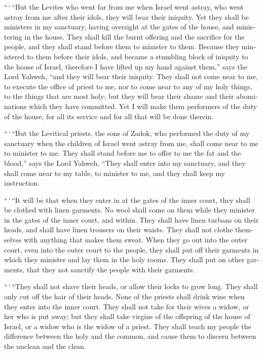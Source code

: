 \begin{paracol}{2}
\begin{otherlanguage}{english}
 ``\,`\,``But the Levites who went far from me when
Israel went astray, who went astray from me after their idols, they will
bear their iniquity.  Yet they shall be ministers in my
sanctuary, having oversight at the gates of the house, and ministering
in the house. They shall kill the burnt offering and the sacrifice for
the people, and they shall stand before them to minister to them.
 Because they ministered to them before their idols, and
became a stumbling block of iniquity to the house of Israel, therefore I
have lifted up my hand against them,'' says the Lord Yahweh, ``and they
will bear their iniquity.  They shall not come near to
me, to execute the office of priest to me, nor to come near to any of my
holy things, to the things that are most holy; but they will bear their
shame and their abominations which they have committed. 
Yet I will make them performers of the duty of the house, for all its
service and for all that will be done therein.

 ``\,`\,``But the Levitical priests, the sons of Zadok,
who performed the duty of my sanctuary when the children of Israel went
astray from me, shall come near to me to minister to me. They shall
stand before me to offer to me the fat and the blood,'' says the Lord
Yahweh.  ``They shall enter into my sanctuary, and they
shall come near to my table, to minister to me, and they shall keep my
instruction.

 ``\,`\,``It will be that when they enter in at the gates
of the inner court, they shall be clothed with linen garments. No wool
shall come on them while they minister in the gates of the inner court,
and within.  They shall have linen turbans on their
heads, and shall have linen trousers on their waists. They shall not
clothe themselves with anything that makes them sweat. 
When they go out into the outer court, even into the outer court to the
people, they shall put off their garments in which they minister and lay
them in the holy rooms. They shall put on other garments, that they not
sanctify the people with their garments.

 ``\,`\,``They shall not shave their heads, or allow
their locks to grow long. They shall only cut off the hair of their
heads.  None of the priests shall drink wine when they
enter into the inner court.  They shall not take for
their wives a widow, or her who is put away; but they shall take virgins
of the offspring of the house of Israel, or a widow who is the widow of
a priest.  They shall teach my people the difference
between the holy and the common, and cause them to discern between the
unclean and the clean.


\end{otherlanguage}
\end{paracol}

